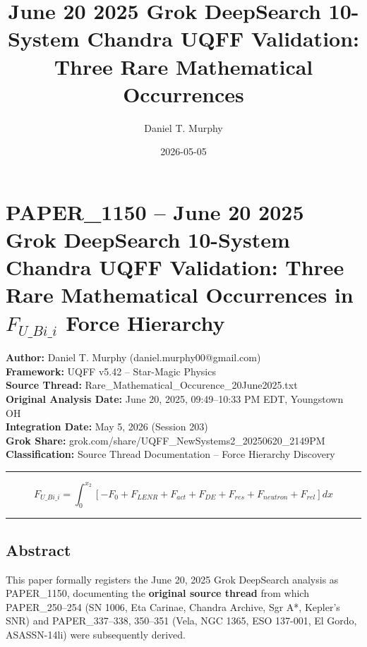 \documentclass[
  11pt,
]{article}
\title{June 20 2025 Grok DeepSearch 10-System Chandra UQFF Validation:
Three Rare Mathematical Occurrences}
\author{Daniel T. Murphy}
\date{2026-05-05}
\begin{document}
\maketitle

\section{\texorpdfstring{PAPER\_1150 -- June 20 2025 Grok DeepSearch
10-System Chandra UQFF Validation: Three Rare Mathematical Occurrences
in \(F_{U\_Bi\_i}\) Force
Hierarchy}{PAPER\_1150 -- June 20 2025 Grok DeepSearch 10-System Chandra UQFF Validation: Three Rare Mathematical Occurrences in F\_\{U\textbackslash\_Bi\textbackslash\_i\} Force Hierarchy}}\label{paper_1150-june-20-2025-grok-deepsearch-10-system-chandra-uqff-validation-three-rare-mathematical-occurrences-in-f_u_bi_i-force-hierarchy}

\textbf{Author:} Daniel T. Murphy (daniel.murphy00@gmail.com)\\
\textbf{Framework:} UQFF v5.42 -- Star-Magic Physics\\
\textbf{Source Thread:} Rare\_Mathematical\_Occurence\_20June2025.txt\\
\textbf{Original Analysis Date:} June 20, 2025, 09:49--10:33 PM EDT,
Youngstown OH\\
\textbf{Integration Date:} May 5, 2026 (Session 203)\\
\textbf{Grok Share:}
grok.com/share/UQFF\_NewSystems2\_20250620\_2149PM\\
\textbf{Classification:} Source Thread Documentation -- Force Hierarchy
Discovery

\begin{center}\rule{0.5\linewidth}{0.5pt}\end{center}

\[F_{U\_Bi\_i} = \int_0^{x_2} \left[ -F_0 + F_{LENR} + F_{act} + F_{DE} + F_{res} + F_{neutron} + F_{rel} \right] dx\]

\begin{center}\rule{0.5\linewidth}{0.5pt}\end{center}

\subsection{Abstract}\label{abstract}

This paper formally registers the June 20, 2025 Grok DeepSearch analysis
as PAPER\_1150, documenting the \textbf{original source thread} from
which PAPER\_250--254 (SN 1006, Eta Carinae, Chandra Archive, Sgr A*,
Kepler's SNR) and PAPER\_337--338, 350--351 (Vela, NGC 1365, ESO
137-001, El Gordo, ASASSN-14li) were subsequently derived.
\end{document}
